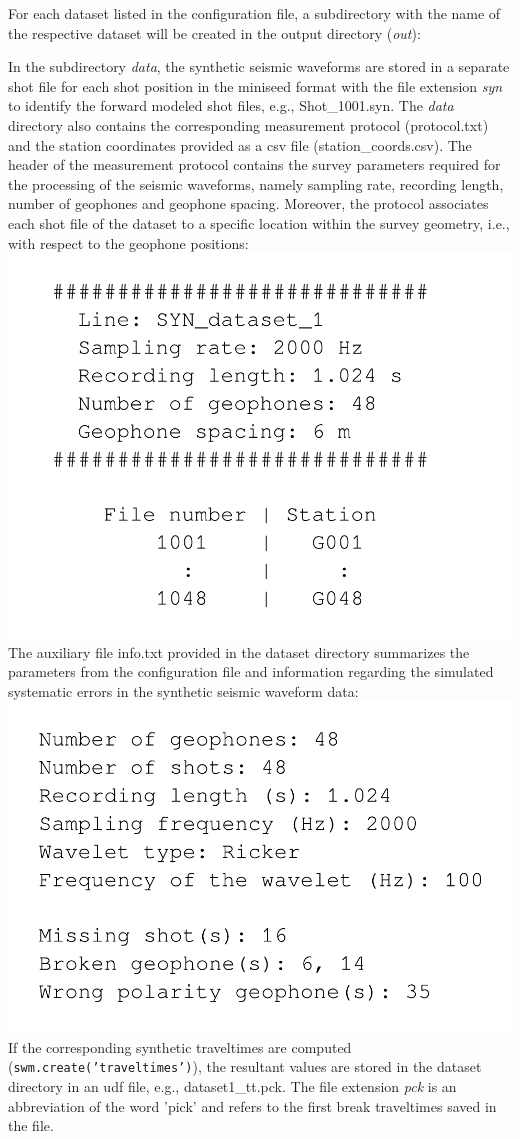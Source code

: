 \documentclass[a4paper,fleqn]{cas-sc}
\begin{document}
\clearpage
For each dataset listed in the configuration file, a subdirectory with the name of the respective dataset will be created in the output directory (\textit{out}):

In the subdirectory \textit{data}, the synthetic seismic waveforms are stored in a separate shot file for each shot position in the miniseed format \citep{ahern2012, ringler2015} with the file extension \textit{syn} to identify the forward modeled shot files, e.g., Shot\_1001.syn. 
The \textit{data} directory also contains the corresponding measurement protocol (protocol.txt) and the station coordinates provided as a csv file (station\_coords.csv). The header of the measurement protocol contains the survey parameters required for the processing of the seismic waveforms, namely sampling rate, recording length, number of geophones and geophone spacing. Moreover, the protocol associates each shot file of the dataset to a specific location within the survey geometry, i.e., with respect to the geophone positions:
\newline
\includegraphics[width=.3\textwidth]{./figures/protocol.pdf}
\newline
The auxiliary file info.txt provided in the dataset directory summarizes the parameters from the configuration file and information regarding the simulated systematic errors in the synthetic seismic waveform data:
\newline
\includegraphics[width=.3\textwidth]{./figures/info.pdf}
\newline
If the corresponding synthetic traveltimes are computed (\texttt{swm.create('traveltimes')}), the resultant values are stored in the dataset directory in an udf file, e.g., dataset1\_tt.pck. The file extension \textit{pck} is an abbreviation of the word 'pick' and refers to the first break traveltimes saved in the file.
\end{document}
